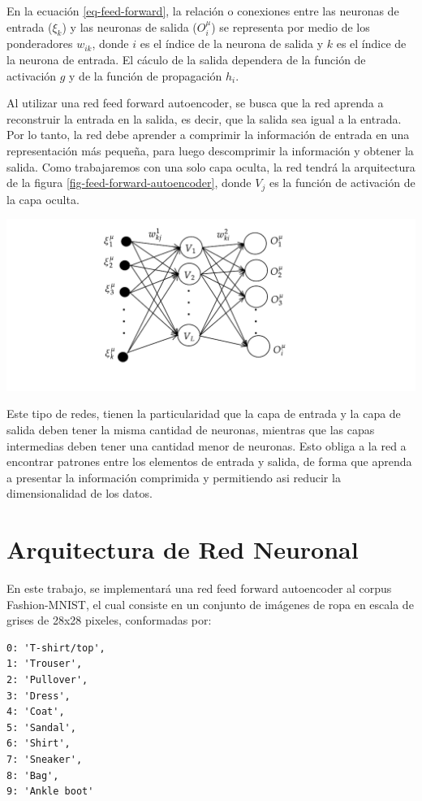 \documentclass[aps,prl,reprint,groupedaddress]{revtex4-2}
\newenvironment{Figura}
  {\par\medskip\noindent\minipage{\linewidth}}
  {\endminipage\par\medskip}
\begin{document}
En la ecuación \ref{eq-feed-forward}, la relación o conexiones entre las neuronas 
de entrada ($\xi_{k}$) y las neuronas de salida ($O^{\mu}_{i}$) se representa por 
medio de los ponderadores $w_{ik}$, donde $i$ es el índice de la neurona de salida 
y $k$ es el índice de la neurona de entrada. El cáculo de la salida dependera 
de la función de activación $g$ y de la función de propagación $h_{i}$.

Al utilizar una red feed forward autoencoder, se busca que la red aprenda a
reconstruir la entrada en la salida, es decir, que la salida sea igual a la entrada.
Por lo tanto, la red debe aprender a comprimir la información de entrada en una
representación más pequeña, para luego descomprimir la información y obtener la
salida. Como trabajaremos con una solo capa oculta, la red tendrá la
arquitectura de la figura \ref{fig-feed-forward-autoencoder}, donde $V_{j}$ 
es la función de activación de la capa oculta.

\begin{Figura}
  \centering
  \includegraphics[width=1\textwidth]{figs/red-autoencoder.pdf}
  \label{fig-feed-forward-autoencoder}
\end{Figura}

Este tipo de redes, tienen la particularidad que la capa de entrada y la capa 
de salida deben tener la misma cantidad de neuronas, mientras que las capas 
intermedias deben tener una cantidad menor de neuronas. Esto obliga a la red a 
encontrar patrones entre los elementos de entrada y salida, de forma que aprenda 
a presentar la información comprimida y permitiendo asi reducir la dimensionalidad 
de los datos. 

\section{Arquitectura de Red Neuronal}
En este trabajo, se implementará una red feed forward autoencoder al corpus 
Fashion-MNIST, el cual consiste en un conjunto de imágenes de ropa en escala de
grises de 28x28 pixeles, conformadas por:
\begin{verbatim}
0: 'T-shirt/top',
1: 'Trouser',
2: 'Pullover',
3: 'Dress',
4: 'Coat',
5: 'Sandal',
6: 'Shirt',
7: 'Sneaker',
8: 'Bag',
9: 'Ankle boot'
\end{verbatim}
\end{document}
